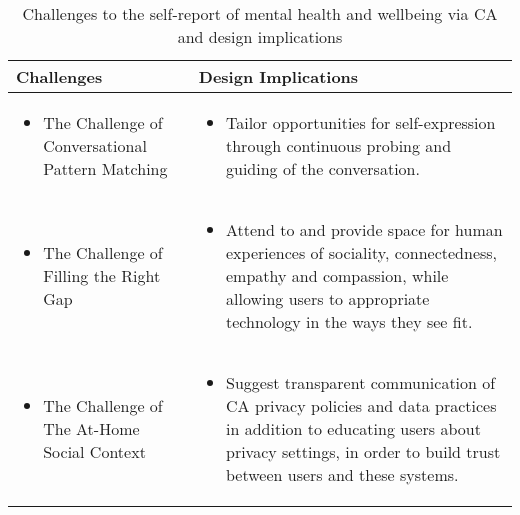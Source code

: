 \begin{table}[]
    \small
    \centering
    \caption{Challenges to the self-report of mental health and wellbeing via \ac{CA} and design implications}
    \begin{tabular}{p{4cm}p{9.25cm}}
        \toprule
        \textbf{Challenges} & \textbf{Design Implications}\\
        \midrule
            
            \begin{itemize}[leftmargin=0em]
                \item[]  The Challenge of Conversational Pattern Matching
            \end{itemize}   
            
        & 
             
            \begin{itemize}[leftmargin=1em]
                \item  Tailor opportunities for self-expression through continuous probing and guiding of the conversation.
            \end{itemize}\\

             
            \begin{itemize}[leftmargin=0em]
                \item[] The Challenge of Filling the Right Gap
            \end{itemize}   
        & 
             
            \begin{itemize}[leftmargin=1em]
                \item Attend to and provide space for human experiences of sociality, connectedness, empathy and compassion, while allowing users to appropriate technology in the ways they see fit.
            \end{itemize}\\
            
             
            \begin{itemize}[leftmargin=0em]
                \item[] The Challenge of The At-Home Social Context
            \end{itemize}   
        & 
             
            \begin{itemize}[leftmargin=1em]
                \item Suggest transparent communication of \ac{CA} privacy policies and data practices in addition to educating users about privacy settings, in order to build trust between users and these systems.
            \end{itemize}\\
        \bottomrule
    \end{tabular}
    \label{tab:challenges}
\end{table}